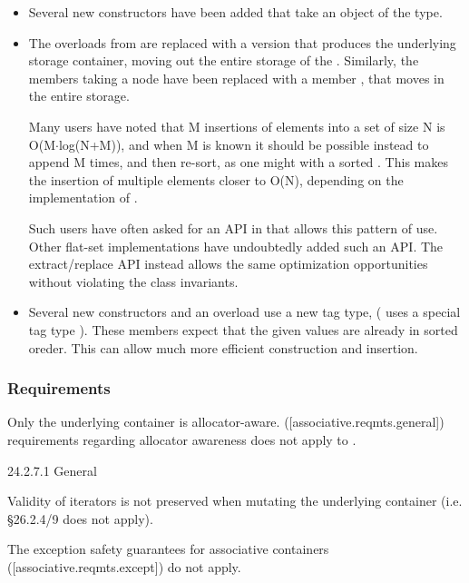 \begin{itemize}
  \item Several new constructors have been added that take an object of the
     type.

  \item The  overloads from  are replaced with a
    version that produces the underlying storage container, moving out the
    entire storage of the .  Similarly, the 
    members taking a node have been replaced with a member , that moves in the entire storage.

    Many users have noted that M insertions of elements into a set of size N
    is O(M$\cdot$log(N+M)), and when M is known it should be possible instead
    to append M times, and then re-sort, as one might with a sorted
    .  This makes the insertion of multiple elements closer to
    O(N), depending on the implementation of .

    Such users have often asked for an API in
     that allows this pattern of use.  Other
    flat-set implementations have undoubtedly added such an API.  The
    extract/replace API instead allows the same optimization opportunities
    without violating the class invariants.

  \item Several new constructors and an  overload use a new tag
    type,  ( uses a special tag type
    ).  These members expect that the given values are already
    in sorted oreder.  This can allow much more efficient construction and
    insertion.
\end{itemize}

\subsubsection{ Requirements}

Only the underlying container is allocator-aware.  ([associative.reqmts.general])
requirements regarding allocator awareness does not apply to .

24.2.7.1 General

Validity of iterators is not preserved when mutating the underlying container
(i.e. \S26.2.4/9 does not apply).

The exception safety guarantees for associative containers ([associative.reqmts.except]) do not
apply.

